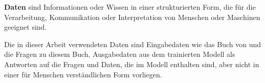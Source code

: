 \begin{definition}\label{def:daten}
    \textbf{Daten} sind Informationen oder Wissen in einer strukturierten Form, die für die Verarbeitung, Kommunikation oder Interpretation von Menschen oder Maschinen geeignet sind.
\end{definition}
Die in dieser Arbeit verwendeten Daten sind Eingabedaten wie das Buch von \citet{bb} und die Fragen zu diesem Buch, Ausgabedaten aus dem trainierten Modell
als Antworten auf die Fragen und Daten, die im Modell enthalten sind, aber nicht in einer für Menschen verständlichen Form vorliegen.

